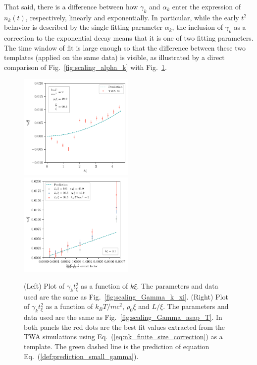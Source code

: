 \documentclass[aps,prd,notitlepage,amsfonts,amssymb,amsmath,nofootinbib,superscriptaddress,longbibliography]{revtex4-2}
\begin{document}
\begin{appendices}
That said, there is a difference between how $\gamma_k$ and $\alpha_k$ enter the expression of $n_k(t)$, respectively, linearly and exponentially.  In particular, while the early $t^{2}$ behavior is described by the single fitting parameter $\alpha_{k}$, the inclusion of $\gamma_{k}$ as a correction to the exponential decay means that it is one of two fitting parameters.   The time window of fit is large enough so that the difference between these two templates (applied on the same data) is visible, as illustrated by a direct comparison of Fig.~\ref{fig:scaling_alpha_k} with Fig.~\ref{fig:scaling_small_gamma}.
 
\begin{figure}
    \centering
    \includegraphics[width=0.495\textwidth]{fig12a.pdf}
    \hfill
    \includegraphics[width=0.495\textwidth]{fig12b.pdf}
    
    \caption{(Left) Plot of $\gamma_k  t_{\xi}^2$ as a function of $k \xi$. The parameters and data used are the same as  Fig.~\ref{fig:scaling_Gamma_k_xi}.
   (Right) Plot of $\gamma_k  t_{\xi}^2$ as a function of $k_{B} T/ m c^2$, $ \rho_0 \xi$ and $L/ \xi$. The parameters and data used are the same as  Fig.~\ref{fig:scaling_Gamma_asap_T}. 
   In both panels the red dots are the best fit values extracted from the TWA simulations using Eq.~(\ref{eq:nk_finite_size_correction}) as a template. The green dashed line is the prediction of equation Eq.~(\ref{def:prediction_small_gamma}).
    }
    \label{fig:scaling_small_gamma}


\end{figure}
\end{appendices}
\end{document}
